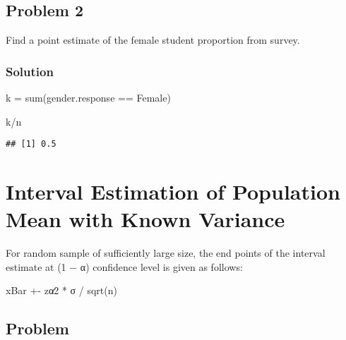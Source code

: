 \documentclass[
]{article}
\newenvironment{Shaded}{\begin{snugshade}}{\end{snugshade}}
\newcommand{\FunctionTok}[1]{\textcolor[rgb]{0.00,0.00,0.00}{#1}}
\newcommand{\NormalTok}[1]{#1}
\newcommand{\OtherTok}[1]{\textcolor[rgb]{0.56,0.35,0.01}{#1}}
\newcommand{\SpecialCharTok}[1]{\textcolor[rgb]{0.00,0.00,0.00}{#1}}
\newcommand{\StringTok}[1]{\textcolor[rgb]{0.31,0.60,0.02}{#1}}
\begin{document}
\hypertarget{problem-2-1}{%
\subsection{Problem 2}\label{problem-2-1}}

Find a point estimate of the female student proportion from survey.

\hypertarget{solution-6}{%
\subsubsection{Solution}\label{solution-6}}

\begin{Shaded}
\end{Shaded}

\begin{Shaded}
\begin{Highlighting}[]
\NormalTok{k }\OtherTok{=} \FunctionTok{sum}\NormalTok{(gender.response }\SpecialCharTok{==} \StringTok{\textquotesingle{}Female\textquotesingle{}}\NormalTok{)}

\NormalTok{k}\SpecialCharTok{/}\NormalTok{n}
\end{Highlighting}
\end{Shaded}

\begin{verbatim}
## [1] 0.5
\end{verbatim}

\hypertarget{interval-estimation-of-population-mean-with-known-variance}{%
\section{Interval Estimation of Population Mean with Known
Variance}\label{interval-estimation-of-population-mean-with-known-variance}}

For random sample of sufficiently large size, the end points of the
interval estimate at (1 − α) confidence level is given as follows:

xBar +- zα∕2 * σ / sqrt(n)

\hypertarget{problem-5}{%
\subsection{Problem}\label{problem-5}}
\end{document}
